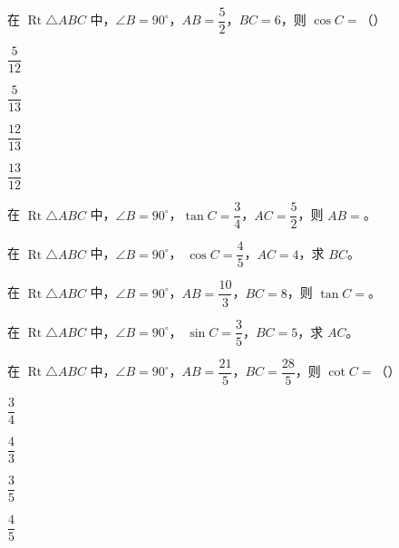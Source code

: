 \documentclass{exam-zh}
\begin{document}
\begin{question}[points=4]
  在 $\operatorname{Rt}\triangle ABC$ 中，$\angle B=90^\circ$，$AB=\dfrac52$，$BC=6$，则 $\cos C=$（\quad）
  
  \begin{choices}
    \item $\dfrac5{12}$
    \item $\dfrac5{13}$
    \item $\dfrac{12}{13}$
    \item $\dfrac{13}{12}$
  \end{choices}
\end{question}



\begin{question}[points=4]
  在 $\operatorname{Rt}\triangle ABC$ 中，$\angle B=90^\circ$，$\tan C=\dfrac34$，$AC=\dfrac52$，则 $AB=$\fillin。
  
\end{question}



\begin{problem}[points=4]
    在 $\operatorname{Rt}\triangle ABC$ 中，$\angle B=90^\circ$，
$\cos C=\dfrac45$，$AC=4$，求 $BC$。

    
  \answerarea[28mm]
\end{problem}




\begin{question}[points=4]
  在 $\operatorname{Rt}\triangle ABC$ 中，$\angle B=90^\circ$，$AB=\dfrac{10}{3}$，$BC=8$，则 $\tan C=$\fillin。
  
\end{question}



\begin{problem}[points=4]
    在 $\operatorname{Rt}\triangle ABC$ 中，$\angle B=90^\circ$，
$\sin C=\dfrac35$，$BC=5$，求 $AC$。

    
  \answerarea[28mm]
\end{problem}



\begin{question}[points=4]
  在 $\operatorname{Rt}\triangle ABC$ 中，$\angle B=90^\circ$，$AB=\dfrac{21}{5}$，$BC=\dfrac{28}{5}$，则 $\cot C=$（\quad）
  
  \begin{choices}
    \item $\dfrac34$
    \item $\dfrac43$
    \item $\dfrac35$
    \item $\dfrac45$
  \end{choices}
\end{question}
\end{document}

